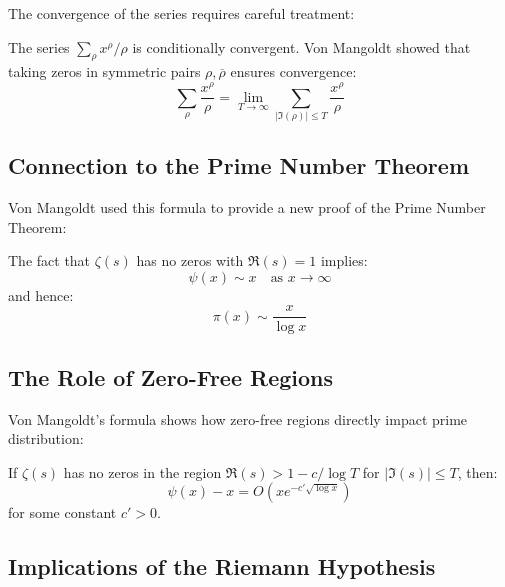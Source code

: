 The convergence of the series requires careful treatment:

\begin{remark}
The series $\sum_{\rho} x^{\rho}/\rho$ is conditionally convergent. Von Mangoldt showed that taking zeros in symmetric pairs $\rho, \overline{\rho}$ ensures convergence:
\begin{equation}
\sum_{\rho} \frac{x^{\rho}}{\rho} = \lim_{T \to \infty} \sum_{|\Im(\rho)| \leq T} \frac{x^{\rho}}{\rho}
\end{equation}
\end{remark}

\subsection{Connection to the Prime Number Theorem}

Von Mangoldt used this formula to provide a new proof of the Prime Number Theorem:

\begin{theorem}
The fact that $\zeta(s)$ has no zeros with $\Re(s) = 1$ implies:
\begin{equation}
\psi(x) \sim x \quad \text{as } x \to \infty
\end{equation}
and hence:
\begin{equation}
\pi(x) \sim \frac{x}{\log x}
\end{equation}
\end{theorem}

\subsection{The Role of Zero-Free Regions}

Von Mangoldt's formula shows how zero-free regions directly impact prime distribution:

\begin{theorem}
If $\zeta(s)$ has no zeros in the region $\Re(s) > 1 - c/\log T$ for $|\Im(s)| \leq T$, then:
\begin{equation}
\psi(x) - x = O(x e^{-c'\sqrt{\log x}})
\end{equation}
for some constant $c' > 0$.
\end{theorem}

\subsection{Implications of the Riemann Hypothesis}

